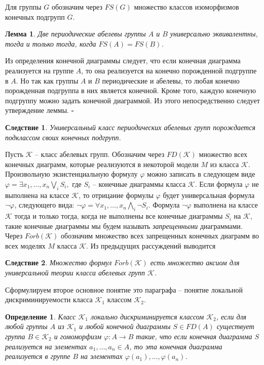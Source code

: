 \documentclass[a4paper,11pt,twoside]{article}
\newtheorem{lemma}{Лемма}[section]
\newtheorem{corollary}{Следствие}[section]
\newtheorem{definition}{Определение}[section]
\def\proof{{\noindent{\bf Доказательство.}} }
\def\K{{\mathcal{K}}}
\begin{document}
Для группы $G$ обозначим через $FS(G)$ множество классов изоморфизмов конечных подгрупп $G$.

\begin{lemma}\label{lemma:UnivEquivFS}
Две периодические абелевы группы $A$ и $B$ универсально эквивалентны, тогда и только тогда, когда $FS(A) = FS(B)$.
\end{lemma}
\proof Из определения конечной диаграммы следует, что если конечная диаграмма реализуется на группе $A$, то она реализуется на конечно порожденной подгруппе в $A$. Но так как группы $A$ и $B$ периодические и абелевы, то любая конечно порожденная подгруппа в них является конечной. Кроме того, каждую конечную подгруппу можно задать конечной диаграммой. Из этого непосредственно следует утверждение леммы. $\square$

\begin{corollary}\label{cor:ClassPerdiodicAbelinaGroup}
Универсальный класс периодических абелевых групп порождается подклассом своих конечных подгрупп.
\end{corollary}

Пусть $\K$ -- класс абелевых групп. Обозначим через $FD(\K)$ множество всех конечных диаграмм, которые реализуются в некоторой модели $M$ из класса $\K$. Произвольную экзистенциальную формулу $\varphi$ можно записать в следующем виде $\varphi = \exists x_1, \ldots, x_n \bigvee\limits_{i} S_i,$ где $S_i$ -- конечные диаграммы класса $\K$. Если формула $\varphi$ не выполнена на классе $\K$, то отрицание формулы $\varphi$ будет универсальная формула $\neg \varphi$, следующего вида: $\neg \varphi = \forall x_1, \ldots, x_n \bigwedge\limits_{i} \neg S_i$. Формула $\neg \varphi$ выполнена на классе $\K$ тогда и только тогда, когда не выполнены все конечные диаграммы $S_i$ на $\K$, такие конечные диаграммы мы будем называть \textit{запрещенными} диаграммами. Через $Forb(\K)$ обозначим множество всех запрещенных конечных диаграмм во всех моделях $M$ класса $\K$. Из предыдущих рассуждений выводится

\begin{corollary}
Множество формул $Forb(\K)$ есть множество аксиом для универсальной теории класса абелевых групп $\K$.
\end{corollary}


Сформулируем второе основное понятие это параграфа -- понятие локальной дискриминируемости класса $\K_1$ классом $\K_2$.
\begin{definition}
Класс $\K_1$ локально дискриминируется классом $\K_2$, если для любой группы $A$ из $\K_1$ и любой конечной диаграммы $S \in FD(A)$ существует группа $B \in \K_2$ и гомоморфизм $\varphi: A \rightarrow B$ такие, что если конечная диаграмма $S$ реализуется на элементах $a_1, \ldots, a_n \in A$, то эта конечная диаграмма реализуется в группе $B$ на элементах $\varphi(a_1), \ldots, \varphi(a_n)$.
\end{definition}
\end{document}

